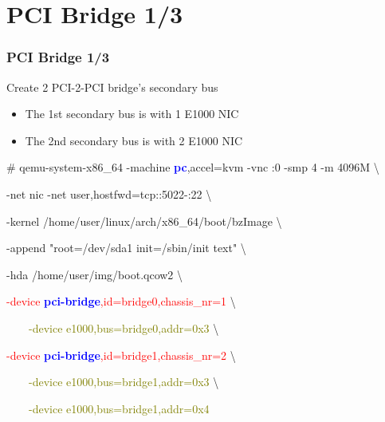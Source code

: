 \documentclass[aspectratio=169]{beamer}
\begin{document}
\section{PCI Bridge 1/3}
\begin{frame}
\frametitle{PCI Bridge 1/3}
{\LARGE Create 2 PCI-2-PCI bridge's secondary bus}
\begin{itemize}
\item The 1st secondary bus is with 1 E1000 NIC
\item The 2nd secondary bus is with 2 E1000 NIC
\end{itemize}
\begin{block}{}

\# qemu-system-x86\_64 -machine \textbf{\textcolor{blue}{pc}},accel=kvm -vnc :0 -smp 4 -m 4096M \textbackslash

-net nic -net user,hostfwd=tcp::5022-:22 \textbackslash

-kernel /home/user/linux/arch/x86\_64/boot/bzImage \textbackslash
	
-append "root=/dev/sda1 init=/sbin/init text" \textbackslash

-hda /home/user/img/boot.qcow2 \textbackslash

\textcolor{red}{-device \textbf{\textcolor{blue}{pci-bridge}},id=bridge0,chassis\_nr=1} \textbackslash

\textcolor{olive}{\ \ \ \ -device e1000,bus=bridge0,addr=0x3} \textbackslash

\textcolor{red}{-device \textbf{\textcolor{blue}{pci-bridge}},id=bridge1,chassis\_nr=2} \textbackslash

\textcolor{olive}{\ \ \ \ -device e1000,bus=bridge1,addr=0x3} \textbackslash

\textcolor{olive}{\ \ \ \ -device e1000,bus=bridge1,addr=0x4}

\end{block}
\end{frame}

\end{document}
